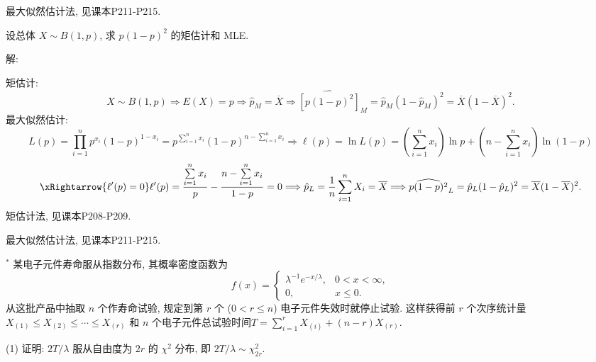 \documentclass[standard]{ExBook}
\renewenvironment{shaded}{%
  \def\FrameCommand{\fboxsep=\FrameSep \colorbox{shadecolor}}%
  \MakeFramed{\advance\hsize-\width \FrameRestore}%
}{%
  \endMakeFramed
}
\begin{document}
\begin{qitems}
\textcolor{themeColor}{\selectfont {} 最大似然估计法, 见课本P211-P215.}

\vspace{2.5cm-5em}

    \begin{bbox}
    \begin{shaded}
        \qitem
设总体 \(X \sim B(1, p)\), 求 \(p(1 - p)^2\) 的矩估计和 MLE.
    \end{shaded}
    \end{bbox}

\vspace{\dimexpr2.5cm-5em\relax}

解:

矩估计:
$$
X\sim B(1,p)
\Longrightarrow
E(X)=p
\Longrightarrow
\hat{p}_{M}=\overline{X}
\Longrightarrow
\widehat{[p(1-p)^2]}_{M}
=\hat{p}_{M}(1-\hat{p}_{M})^2
=\overline{X}(1-\overline{X})^2.
$$
最大似然估计:
$$
L(p)
=\prod_{i=1}^{n}p^{x_i}(1-p)^{1-x_i}
=p^{\sum\limits_{i=1}^{n}x_i}(1-p)^{n-\sum\limits_{i=1}^{n}x_i}
\Longrightarrow
\ell(p)=\ln L(p)
=\left(\sum_{i=1}^{n}x_i\right)\ln p+
\left(n-\sum_{i=1}^{n}x_i\right)\ln(1-p)
$$
$$
\xRightarrow{\ell'(p)=0}
\ell'(p)=\frac{\sum\limits_{i=1}^{n}x_i}{p}
-\frac{n-\sum\limits_{i=1}^{n}x_i}{1-p}=0
\Longrightarrow
\hat{p}_{L}
=\frac{1}{n}\sum_{i=1}^{n}X_i
=\overline{X}
\Longrightarrow
\widehat{p(1-p)^2}_{L}
=\hat{p}_{L}(1-\hat{p}_{L})^2
=\overline{X}(1-\overline{X})^2.
$$
\textcolor{themeColor}{\selectfont {} 矩估计法, 见课本P208-P209.}

\textcolor{themeColor}{\selectfont {} 最大似然估计法, 见课本P211-P215.}

\vspace{2.5cm-5em}

    \begin{bbox}
    \begin{shaded}
        \qitem$^*$
某电子元件寿命服从指数分布, 其概率密度函数为
\[f(x) = 
\begin{cases} 
\lambda^{-1} e^{-x/\lambda}, & 0 < x < \infty, \\
0, & x \leq 0.
\end{cases}\]
从这批产品中抽取 \( n \) 个作寿命试验, 规定到第 \( r \) 个 (\( 0 < r \leq n \)) 电子元件失效时就停止试验. 这样获得前 \( r \) 个次序统计量 \( X_{(1)} \leq X_{(2)} \leq \cdots \leq X_{(r)} \) 和 \( n \) 个电子元件总试验时间\(T = \displaystyle\sum\limits_{i=1}^{r} X_{(i)} + (n-r)X_{(r)}\).

(1) 证明: \( 2T/\lambda \) 服从自由度为 \( 2r \) 的 \( \chi^2 \) 分布, 即 \( 2T/\lambda \sim \chi_{2r}^2 \).  


\end{shaded}
\end{bbox}
\end{qitems}
\end{document}

